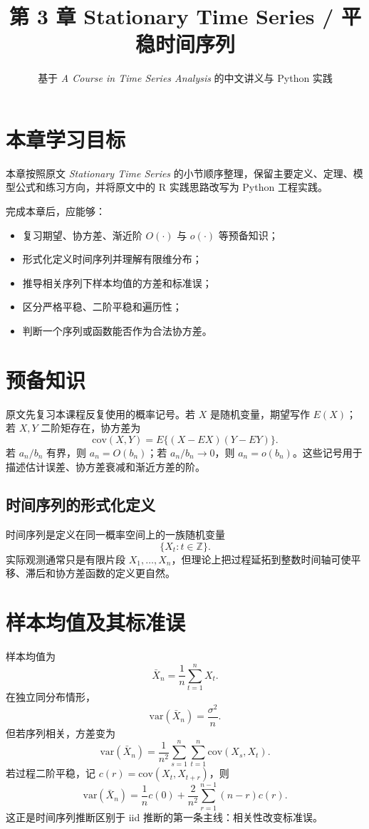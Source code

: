 \documentclass[11pt,a4paper]{ctexart}
\title{第 3 章 \quad Stationary Time Series / 平稳时间序列}
\author{基于 \textit{A Course in Time Series Analysis} 的中文讲义与 Python 实践}
\date{}
\begin{document}
\maketitle

\section*{本章学习目标}

本章按照原文 \textit{Stationary Time Series} 的小节顺序整理，保留主要定义、定理、模型公式和练习方向，并将原文中的 R 实践思路改写为 Python 工程实践。

完成本章后，应能够：
\begin{itemize}
  \item 复习期望、协方差、渐近阶 \(O(\cdot)\) 与 \(o(\cdot)\) 等预备知识；
  \item 形式化定义时间序列并理解有限维分布；
  \item 推导相关序列下样本均值的方差和标准误；
  \item 区分严格平稳、二阶平稳和遍历性；
  \item 判断一个序列或函数能否作为合法协方差。
\end{itemize}

\section{预备知识}

原文先复习本课程反复使用的概率记号。若 \(X\) 是随机变量，期望写作 \(E(X)\)；若 \(X,Y\) 二阶矩存在，协方差为
\[
  \mathrm{cov}(X,Y)=E\{(X-E X)(Y-E Y)\}.
\]
若 \(a_n/b_n\) 有界，则 \(a_n=O(b_n)\)；若 \(a_n/b_n\to0\)，则 \(a_n=o(b_n)\)。这些记号用于描述估计误差、协方差衰减和渐近方差的阶。

\subsection{时间序列的形式化定义}

时间序列是定义在同一概率空间上的一族随机变量
\[
  \{X_t:t\in\mathbb Z\}.
\]
实际观测通常只是有限片段 \(X_1,\ldots,X_n\)，但理论上把过程延拓到整数时间轴可使平移、滞后和协方差函数的定义更自然。

\section{样本均值及其标准误}

样本均值为
\[
  \bar X_n=\frac1n\sum_{t=1}^n X_t.
\]
在独立同分布情形，
\[
  \mathrm{var}(\bar X_n)=\frac{\sigma^2}{n}.
\]
但若序列相关，方差变为
\[
  \mathrm{var}(\bar X_n)
  =\frac1{n^2}\sum_{s=1}^n\sum_{t=1}^n\mathrm{cov}(X_s,X_t).
\]
若过程二阶平稳，记 \(c(r)=\mathrm{cov}(X_t,X_{t+r})\)，则
\[
  \mathrm{var}(\bar X_n)
  =\frac1n c(0)+\frac2{n^2}\sum_{r=1}^{n-1}(n-r)c(r).
\]
这正是时间序列推断区别于 iid 推断的第一条主线：相关性改变标准误。
\end{document}
